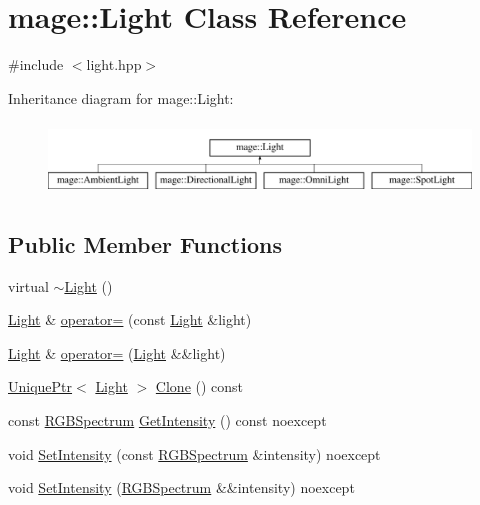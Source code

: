 \hypertarget{classmage_1_1_light}{}\section{mage\+:\+:Light Class Reference}
\label{classmage_1_1_light}


{\ttfamily \#include $<$light.\+hpp$>$}

Inheritance diagram for mage\+:\+:Light\+:\begin{figure}[H]
\begin{center}
\leavevmode
\includegraphics[height=1.944445cm]{classmage_1_1_light}
\end{center}
\end{figure}
\subsection*{Public Member Functions}
\begin{DoxyCompactItemize}
\item 
virtual \hyperlink{classmage_1_1_light_af877bc473dede83689a4bda8a36d4d36}{$\sim$\+Light} ()
\item 
\hyperlink{classmage_1_1_light}{Light} \& \hyperlink{classmage_1_1_light_ad1267c8d162e2cdead5e3a7d83cef3c1}{operator=} (const \hyperlink{classmage_1_1_light}{Light} \&light)
\item 
\hyperlink{classmage_1_1_light}{Light} \& \hyperlink{classmage_1_1_light_a5fd2edc3fcbcc1dbe7a2620b76cedd25}{operator=} (\hyperlink{classmage_1_1_light}{Light} \&\&light)
\item 
\hyperlink{namespacemage_a8c307fbcc33bce9b7f2aa4c26c3b95cf}{Unique\+Ptr}$<$ \hyperlink{classmage_1_1_light}{Light} $>$ \hyperlink{classmage_1_1_light_a4c87e4a361b20519c49b4a0397625a6a}{Clone} () const
\item 
const \hyperlink{structmage_1_1_r_g_b_spectrum}{R\+G\+B\+Spectrum} \hyperlink{classmage_1_1_light_ad4ffb4c5fa06812e7d523a69b177d55a}{Get\+Intensity} () const noexcept
\item 
void \hyperlink{classmage_1_1_light_ab7312aee7c5f7b4b564e27592e1b4223}{Set\+Intensity} (const \hyperlink{structmage_1_1_r_g_b_spectrum}{R\+G\+B\+Spectrum} \&intensity) noexcept
\item 
void \hyperlink{classmage_1_1_light_af96cc7c32afbfdc4d9b1a19b8ac0bf13}{Set\+Intensity} (\hyperlink{structmage_1_1_r_g_b_spectrum}{R\+G\+B\+Spectrum} \&\&intensity) noexcept
\end{DoxyCompactItemize}
